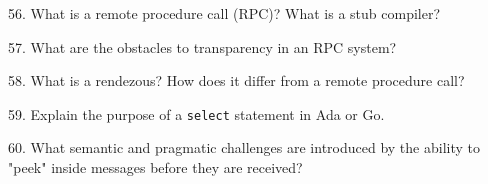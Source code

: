 \filbreak
\vskip 1cm

56. What is a remote procedure call (RPC)? What is a stub compiler?

\filbreak
\vskip 1cm

57. What are the obstacles to transparency in an RPC system?

\filbreak
\vskip 1cm

58. What is a rendezous? How does it differ from a remote procedure call?

\filbreak
\vskip 1cm

59. Explain the purpose of a {\tt select} statement in Ada or Go.

\filbreak
\vskip 1cm
60. What semantic and pragmatic challenges are introduced by the ability to "peek" inside messages before they are received?

\filbreak
\vfill\eject
\bye
